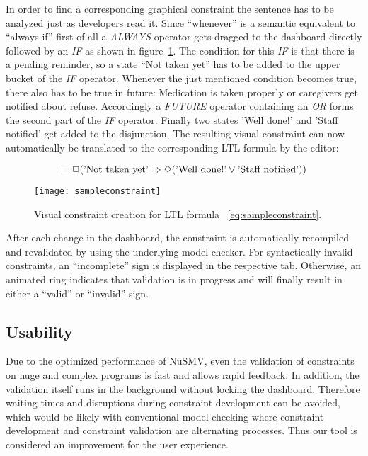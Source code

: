 In order to find a corresponding graphical constraint the sentence has to be analyzed just as developers read it. Since ``whenever'' is a semantic equivalent to ``always if'' first of all a \emph{ALWAYS} operator gets dragged to the dashboard directly followed by an \emph{IF} as shown in figure~\ref{fig:sampleconstraint}. The condition for this \emph{IF} is that there is a pending reminder, so a state ``Not taken yet'' has to be added to the upper bucket of the \emph{IF} operator.
Whenever the just mentioned condition becomes true, there also has to be true in future: Medication is taken properly or caregivers get notified about refuse. Accordingly a \emph{FUTURE} operator containing an \emph{OR} forms the second part of the \emph{IF} operator. Finally two states 'Well done!' and 'Staff notified' get added to the disjunction. The resulting visual constraint can now automatically be translated to the corresponding LTL formula by the editor:

\begin{equation} \label{eq:sampleconstraint}
  \models \Box (\textnormal{'Not taken yet'} \Rightarrow \Diamond (\textnormal{'Well done!'} \vee \textnormal{'Staff notified'}))
\end{equation}

\begin{figure}[htbp]
  \centering
  \texttt{[image: sampleconstraint]}
  \caption{Visual constraint creation for LTL formula ~\ref{eq:sampleconstraint}.}
  \label{fig:sampleconstraint}
\end{figure}

After each change in the dashboard, the constraint is automatically recompiled and revalidated by using the underlying model checker. For syntactically invalid constraints, an ``incomplete'' sign is displayed in the respective tab. Otherwise, an animated ring indicates that validation is in pro\-gress and will finally result in either a ``valid'' or ``invalid'' sign.



\subsection{Usability}

Due to the optimized performance of NuSMV, even the validation of constraints on huge and complex programs is fast and allows rapid feedback. In addition, the validation itself runs in the background without locking the dashboard. Therefore waiting times and disruptions during constraint development can be avoided, which would be likely with conventional model checking where constraint development and constraint validation are alternating processes. Thus our tool is considered an improvement for the user experience.

